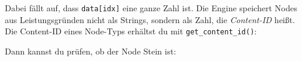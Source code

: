 \begin{Shaded}
\begin{Highlighting}[]
  \OperatorTok{=} \OperatorTok{:}\OperatorTok{(\{}
     \OperatorTok{=} \OperatorTok{,}
     \OperatorTok{=} \OperatorTok{,}
\OperatorTok{\})}

  \OperatorTok{=} \OperatorTok{:}\OperatorTok{(}\OperatorTok{,} \OperatorTok{,} \OperatorTok{)}

\OperatorTok{(}\OperatorTok{[}\OperatorTok{])}
\end{Highlighting}
\end{Shaded}

Dabei fällt auf, dass \texttt{data[idx]} eine ganze Zahl ist. Die Engine
speichert Nodes aus Leistungsgründen nicht als Strings, sondern als
Zahl, die \emph{Content-ID} heißt. Die
Content-ID eines Node-Typs erhältst du mit
\texttt{get\_\allowbreak{}content\_\allowbreak{}id()}:

\begin{Shaded}
\begin{Highlighting}[]
  \OperatorTok{=} \OperatorTok{(}\OperatorTok{)}
\end{Highlighting}
\end{Shaded}

Dann kannst du prüfen, ob der Node Stein ist:

\begin{Shaded}
\begin{Highlighting}[]
  \OperatorTok{=} \OperatorTok{:}\OperatorTok{(}\OperatorTok{,} \OperatorTok{,} \OperatorTok{)}
 \OperatorTok{[}\OperatorTok{]} \OperatorTok{==}  
    \OperatorTok{(}\OperatorTok{)}
\end{Highlighting}
\end{Shaded}


